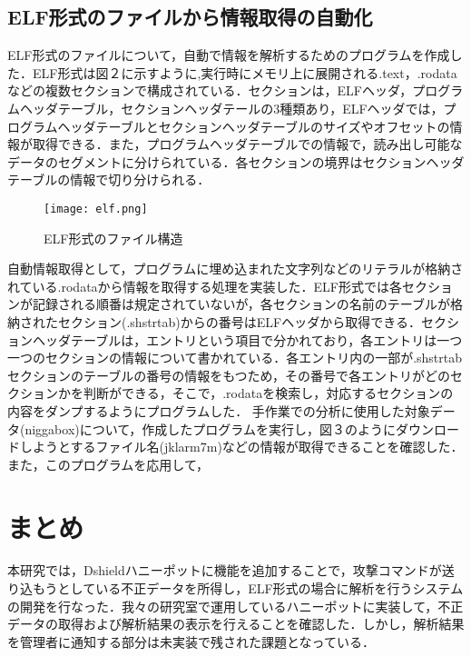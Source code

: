 \documentclass[dvipdfmx]{bta}
\begin{document}
\section{ELF形式のファイルから情報取得の自動化}
ELF形式のファイルについて，自動で情報を解析するためのプログラムを作成した．ELF形式は図２に示すように,実行時にメモリ上に展開される.text，.rodataなどの複数セクションで構成されている．セクションは，ELFヘッダ，プログラムヘッダテーブル，セクションヘッダテールの3種類あり，ELFヘッダでは，プログラムヘッダテーブルとセクションヘッダテーブルのサイズやオフセットの情報が取得できる．また，プログラムヘッダテーブルでの情報で，読み出し可能なデータのセグメントに分けられている．各セクションの境界はセクションヘッダテーブルの情報で切り分けられる．
\begin{figure}[htbp]
	\centering
 	\texttt{[image: elf.png]}
 	\caption{ELF形式のファイル構造}\label{fig:system}
\end{figure}

自動情報取得として，プログラムに埋め込まれた文字列などのリテラルが格納されている.rodataから情報を取得する処理を実装した．ELF形式では各セクションが記録される順番は規定されていないが，各セクションの名前のテーブルが格納されたセクション(.shstrtab)からの番号はELFヘッダから取得できる．セクションヘッダテーブルは，エントリという項目で分かれており，各エントリは一つ一つのセクションの情報について書かれている．各エントリ内の一部が.shstrtabセクションのテーブルの番号の情報をもつため，その番号で各エントリがどのセクションかを判断ができる，そこで，.rodataを検索し，対応するセクションの内容をダンプするようにプログラムした．
手作業での分析に使用した対象データ(niggabox)について，作成したプログラムを実行し，図３のようにダウンロードしようとするファイル名(jklarm7m)などの情報が取得できることを確認した．
また，このプログラムを応用して，

\chapter{まとめ}

本研究では，Dshieldハニーポットに機能を追加することで，攻撃コマンドが送り込もうとしている不正データを所得し，ELF形式の場合に解析を行うシステムの開発を行なった．我々の研究室で運用しているハニーポットに実装して，不正データの取得および解析結果の表示を行えることを確認した．しかし，解析結果を管理者に通知する部分は未実装で残された課題となっている．

%


\end{document}
